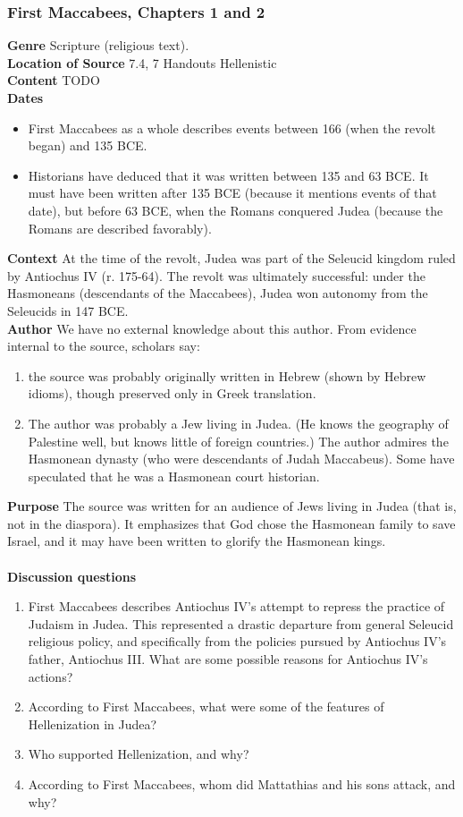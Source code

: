 \documentclass{article}
\begin{document}
\subsubsection*{First Maccabees, Chapters 1 and 2}
\textbf{Genre}
Scripture (religious text). \\
\textbf{Location of Source}
7.4, 7 Handouts Hellenistic \\
\textbf{Content}
TODO \\
\textbf{Dates}
\begin{itemize}
  \item First Maccabees as a whole describes events between 166 (when the revolt began) and 135 BCE.
  \item Historians have deduced that it was written between 135 and 63 BCE.  It must have been written after 135 BCE (because it mentions events of that date), but before 63 BCE, when the Romans conquered Judea (because the Romans are described favorably).
\end{itemize}
\textbf{Context}
At the time of the revolt, Judea was part of the Seleucid kingdom ruled by Antiochus IV (r. 175-64). The revolt was ultimately successful:  under the Hasmoneans (descendants of the Maccabees), Judea won autonomy from the Seleucids in 147 BCE. \\
\textbf{Author}
We have no external knowledge about this author. From evidence internal to the source, scholars say:
\begin{enumerate}
  \item the source was probably originally written in Hebrew (shown by Hebrew idioms), though preserved only in Greek translation.
  \item The author was probably a Jew living in Judea. (He knows the geography of Palestine well, but knows little of foreign countries.)  The author admires the Hasmonean dynasty (who were descendants of Judah Maccabeus).  Some have speculated that he was a Hasmonean court historian.
\end{enumerate}
\textbf{Purpose}
The source was written for an audience of Jews living in Judea (that is, not in the diaspora).  It emphasizes that God chose the Hasmonean family to save Israel, and it may have been written to glorify the Hasmonean kings. \\
\\
\textbf{Discussion questions}
\begin{enumerate}
  \item First Maccabees describes Antiochus IV’s attempt to repress the practice of Judaism in Judea. This represented a drastic departure from general Seleucid religious policy, and specifically from the policies pursued by Antiochus IV’s father, Antiochus III. What are some possible reasons for Antiochus IV’s actions?
  \item According to First Maccabees, what were some of the features of Hellenization in Judea?
  \item Who supported Hellenization, and why?
  \item According to First Maccabees, whom did Mattathias and his sons attack, and why?
\end{enumerate}
\end{document}
